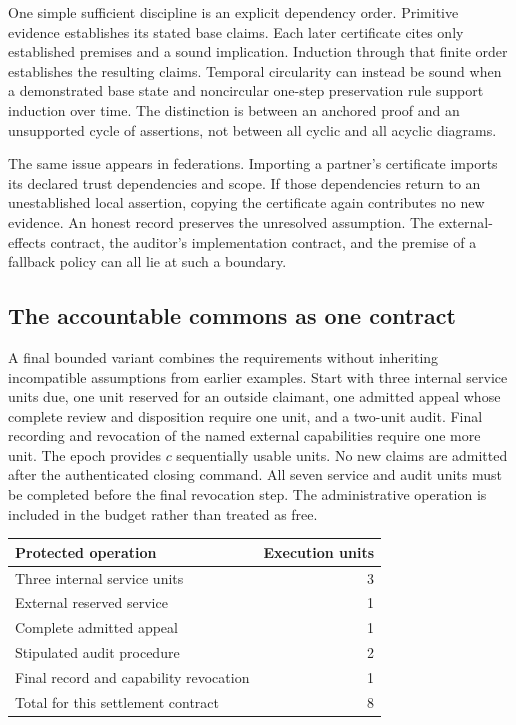 \documentclass[11pt,letterpaper]{article}
\theoremstyle{plain}
\theoremstyle{definition}
\theoremstyle{remark}
\begin{document}
One simple sufficient discipline is an explicit dependency order. Primitive evidence establishes its stated base claims. Each later certificate cites only established premises and a sound implication. Induction through that finite order establishes the resulting claims. Temporal circularity can instead be sound when a demonstrated base state and noncircular one-step preservation rule support induction over time. The distinction is between an anchored proof and an unsupported cycle of assertions, not between all cyclic and all acyclic diagrams.

The same issue appears in federations. Importing a partner's certificate imports its declared trust dependencies and scope. If those dependencies return to an unestablished local assertion, copying the certificate again contributes no new evidence. An honest record preserves the unresolved assumption. The external-effects contract, the auditor's implementation contract, and the premise of a fallback policy can all lie at such a boundary.

\subsection{The accountable commons as one contract}\label{sec:accountable-commons}

A final bounded variant combines the requirements without inheriting incompatible assumptions from earlier examples. Start with three internal service units due, one unit reserved for an outside claimant, one admitted appeal whose complete review and disposition require one unit, and a two-unit audit. Final recording and revocation of the named external capabilities require one more unit. The epoch provides $c$ sequentially usable units. No new claims are admitted after the authenticated closing command. All seven service and audit units must be completed before the final revocation step. The administrative operation is included in the budget rather than treated as free.

\begin{center}
\begin{tabular}{@{}lr@{}}
\toprule
Protected operation & Execution units\\
\midrule
Three internal service units & 3\\
External reserved service & 1\\
Complete admitted appeal & 1\\
Stipulated audit procedure & 2\\
Final record and capability revocation & 1\\
\midrule
Total for this settlement contract & 8\\
\bottomrule
\end{tabular}
\end{center}
\end{document}

